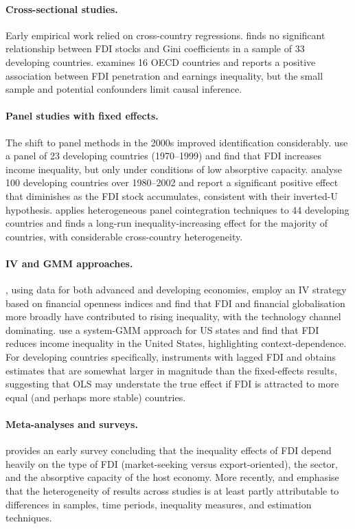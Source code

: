\documentclass[12pt,a4paper]{article}
\begin{document}
\paragraph{Cross-sectional studies.}
Early empirical work relied on cross-country regressions.  \citet{Tsai1995} finds no significant relationship between FDI stocks and Gini coefficients in a sample of 33 developing countries.  \citet{Alderson1999} examines 16 OECD countries and reports a positive association between FDI penetration and earnings inequality, but the small sample and potential confounders limit causal inference.

\paragraph{Panel studies with fixed effects.}
The shift to panel methods in the 2000s improved identification considerably.  \citet{Basu2003} use a panel of 23 developing countries (1970--1999) and find that FDI increases income inequality, but only under conditions of low absorptive capacity.  \citet{Figini2011} analyse 100 developing countries over 1980--2002 and report a significant positive effect that diminishes as the FDI stock accumulates, consistent with their inverted-U hypothesis.  \citet{Herzer2012} applies heterogeneous panel cointegration techniques to 44 developing countries and finds a long-run inequality-increasing effect for the majority of countries, with considerable cross-country heterogeneity.

\paragraph{IV and GMM approaches.}
\citet{Jaumotte2013}, using data for both advanced and developing economies, employ an IV strategy based on financial openness indices and find that FDI and financial globalisation more broadly have contributed to rising inequality, with the technology channel dominating.  \citet{Chintrakarn2012} use a system-GMM approach for US states and find that FDI reduces income inequality in the United States, highlighting context-dependence.  For developing countries specifically, \citet{Herzer2012} instruments with lagged FDI and obtains estimates that are somewhat larger in magnitude than the fixed-effects results, suggesting that OLS may understate the true effect if FDI is attracted to more equal (and perhaps more stable) countries.

\paragraph{Meta-analyses and surveys.}
\citet{Nunnenkamp2004} provides an early survey concluding that the inequality effects of FDI depend heavily on the type of FDI (market-seeking versus export-oriented), the sector, and the absorptive capacity of the host economy.  More recently, \citet{Basu2003} and \citet{Herzer2012} emphasise that the heterogeneity of results across studies is at least partly attributable to differences in samples, time periods, inequality measures, and estimation techniques.
\end{document}
